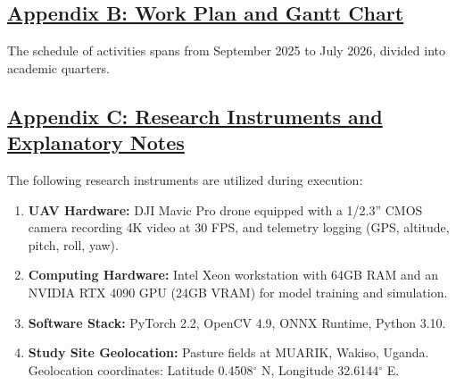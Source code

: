 \documentclass[12pt]{article}
\begin{document}
\clearpage

\subsection*{\underline{\textbf{Appendix B: Work Plan and Gantt Chart}}}
The schedule of activities spans from September 2025 to July 2026, divided into academic quarters.

\begin{table}[h]
\centering
\caption{Research Work Plan and Activity Timeline}
\label{tab:workplan}
\end{table}

\subsection*{\underline{\textbf{Appendix C: Research Instruments and Explanatory Notes}}}
The following research instruments are utilized during execution:
\begin{enumerate}
    \item \textbf{UAV Hardware:} DJI Mavic Pro drone equipped with a 1/2.3'' CMOS camera recording 4K video at 30 FPS, and telemetry logging (GPS, altitude, pitch, roll, yaw).
    \item \textbf{Computing Hardware:} Intel Xeon workstation with 64GB RAM and an NVIDIA RTX 4090 GPU (24GB VRAM) for model training and simulation.
    \item \textbf{Software Stack:} PyTorch 2.2, OpenCV 4.9, ONNX Runtime, Python 3.10.
    \item \textbf{Study Site Geolocation:} Pasture fields at MUARIK, Wakiso, Uganda. Geolocation coordinates: Latitude 0.4508$^{\circ}$ N, Longitude 32.6144$^{\circ}$ E.
\end{enumerate}
\end{document}
